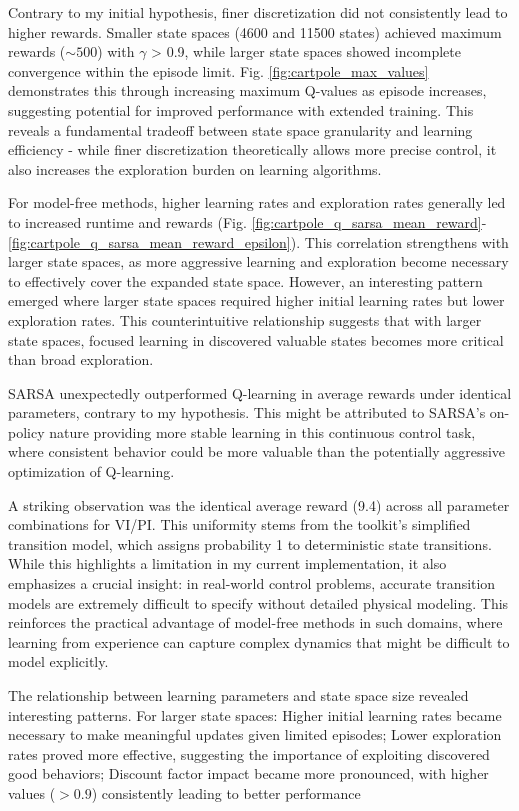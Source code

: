 \documentclass[conference]{IEEEtran}
\begin{document}
Contrary to my initial hypothesis, finer discretization did not consistently lead to higher rewards. Smaller state spaces (4600 and 11500 states) achieved maximum rewards ($\sim 500$) with $\gamma$ > 0.9, while larger state spaces showed incomplete convergence within the episode limit. Fig. \ref{fig:cartpole_max_values} demonstrates this through increasing maximum Q-values as episode increases, suggesting potential for improved performance with extended training. This reveals a fundamental tradeoff between state space granularity and learning efficiency - while finer discretization theoretically allows more precise control, it also increases the exploration burden on learning algorithms.

For model-free methods, higher learning rates and exploration rates generally led to increased runtime and rewards (Fig. \ref{fig:cartpole_q_sarsa_mean_reward}-\ref{fig:cartpole_q_sarsa_mean_reward_epsilon}). This correlation strengthens with larger state spaces, as more aggressive learning and exploration become necessary to effectively cover the expanded state space. However, an interesting pattern emerged where larger state spaces required higher initial learning rates but lower exploration rates. This counterintuitive relationship suggests that with larger state spaces, focused learning in discovered valuable states becomes more critical than broad exploration.

SARSA unexpectedly outperformed Q-learning in average rewards under identical parameters, contrary to my hypothesis. This might be attributed to SARSA's on-policy nature providing more stable learning in this continuous control task, where consistent behavior could be more valuable than the potentially aggressive optimization of Q-learning.

A striking observation was the identical average reward (9.4) across all parameter combinations for VI/PI. This uniformity stems from the toolkit's simplified transition model, which assigns probability 1 to deterministic state transitions. While this highlights a limitation in my current implementation, it also emphasizes a crucial insight: in real-world control problems, accurate transition models are extremely difficult to specify without detailed physical modeling. This reinforces the practical advantage of model-free methods in such domains, where learning from experience can capture complex dynamics that might be difficult to model explicitly.

The relationship between learning parameters and state space size revealed interesting patterns. For larger state spaces: Higher initial learning rates became necessary to make meaningful updates given limited episodes; Lower exploration rates proved more effective, suggesting the importance of exploiting discovered good behaviors; Discount factor impact became more pronounced, with higher values ($> 0.9$) consistently leading to better performance
\end{document}
